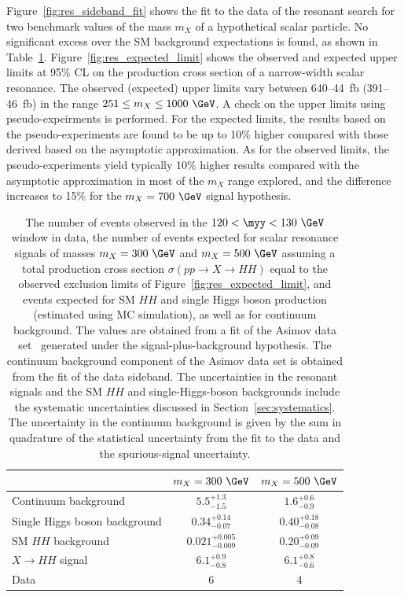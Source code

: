 \documentclass[PAPER, cernpreprint, texlive=2016, paper=a4, USenglish, texmf]{atlasdoc}
\begin{document}
Figure~\ref{fig:res_sideband_fit} shows the fit to the data of the resonant search for two benchmark values of the mass $m_{X}$ of a hypothetical scalar particle. No significant excess over the SM background expectations is found, as shown in Table~\ref{tab:yields2}. Figure~\ref{fig:res_expected_limit} shows the observed and expected upper limits at 95\% CL on the production cross section of a narrow-width scalar resonance. The observed (expected) upper limits vary between 640--44~fb (391--46~fb) in the range $251 \leq m_{X} \leq 1000~\GeV$.
A check on the upper limits using pseudo-expeirments is performed. For the expected limits, the results based on the pseudo-experiments are found to be up to 10\% higher compared with those derived based on the asymptotic approximation. As for the observed limits, the pseudo-experiments yield typically 10\% higher results compared with the asymptotic approximation in most of the $m_X$ range explored, and the difference increases to 15\% for the $m_X=700~\GeV$ signal hypothesis.
 
 
\begin{table}[htb]
\small
\caption{The number of events observed in the  $120<\myy<130~\GeV$ window in data,
the number of events expected for scalar resonance signals of masses  $m_{X}=300~\GeV$ and $m_{X}=500~\GeV$
assuming a total production cross section $\sigma(pp\to X \to HH)$ equal to the observed exclusion limits of Figure~\ref{fig:res_expected_limit},
and events expected for SM $HH$ and single Higgs boson production (estimated using MC simulation),
as well as for continuum background.
The values are obtained from a fit of the Asimov data set~\cite{Cowan:2010js} generated under the signal-plus-background hypothesis. The continuum background component of the Asimov data set is obtained from the fit of the data sideband.
The uncertainties in the resonant signals and the SM $HH$ and
single-Higgs-boson backgrounds include the systematic uncertainties discussed in Section~\ref{sec:systematics}.
The uncertainty in the continuum background is given by the sum in quadrature of the statistical uncertainty
from the fit to the data and the spurious-signal uncertainty.
}
\begin{center}
\begin{tabular}{lcc}
\toprule
\toprule
&  $m_{X}=300~\GeV$ & $m_{X}=500~\GeV$ \\
\midrule
Continuum background             & $5.5^{+1.3}_{-1.5}$       & $1.6^{+0.6}_{-0.9}$  \\[4pt]
Single Higgs boson background    & $0.34^{+0.14}_{-0.07}$     & $0.40^{+0.18}_{-0.08}$  \\[4pt]
SM $HH$ background               & $0.021^{+0.005}_{-0.009}$  & $0.20^{+0.09}_{-0.09}$  \\[4pt]
\midrule
$X \to HH$ signal                & $6.1^{+0.9}_{-0.8}$       & $6.1^{+0.8}_{-0.6}$  \\
\midrule
Data                             & 6  & 4  \\
\bottomrule
\bottomrule
\end{tabular}
\label{tab:yields2}
\end{center}
\end{table}
 
\end{document}
